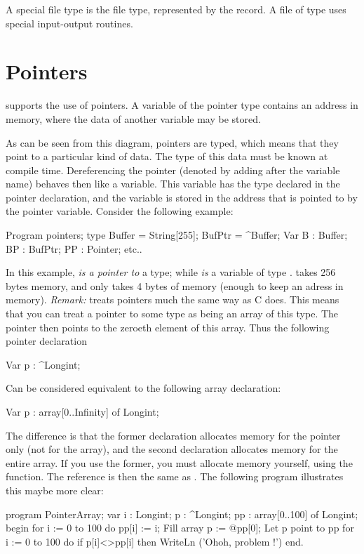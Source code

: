 \documentclass{report}
\begin{document}
A special file type is the  file type, represented by the
 record. A file of type  uses special input-output
routines.
\section{Pointers}
\fpc supports the use of pointers. A variable of the pointer type
contains an address in memory, where the data of another variable may be 
stored.

As can be seen from this diagram, pointers are typed, which means that 
they point to a particular kind of data. The type of this data must be 
known at compile time.
Dereferencing the pointer (denoted by adding \var{\^{}} after the variable
name) behaves then like a variable. This variable has the type declared in
the pointer declaration, and the variable is stored in the address that is 
pointed to by the pointer variable.
Consider the following example:
\begin{listing}
Program pointers;
type 
  Buffer = String[255];
  BufPtr = ^Buffer;
Var B  : Buffer;
    BP : BufPtr;
    PP : Pointer;
etc..
\end{listing}
In this example,  {\em is a pointer to} a  type; while 
{\em is} a variable of type .  takes 256 bytes memory,
and  only takes 4 bytes of memory (enough to keep an adress in
memory).
{\em Remark:} \fpc treats pointers much the same way as C does. This means
that you can treat a pointer to some type as being an array of this type.  
The pointer then points to the zeroeth element of this array. Thus the
following pointer declaration 
\begin{listing}
Var p : ^Longint;
\end{listing}
Can be considered equivalent to the following array declaration:
\begin{listing}
Var p : array[0..Infinity] of Longint;
\end{listing}
The difference is that the former declaration allocates memory for the
pointer only (not for the array), and the second declaration allocates
memory for the entire array. If you use the former, you must allocate memory
yourself, using the  function.
The reference  is then the same as . The following program
illustrates this maybe more clear:
\begin{listing}
program PointerArray;
var i : Longint;
    p : ^Longint;
    pp : array[0..100] of Longint;  
begin
  for i := 0 to 100 do pp[i] := i; { Fill array }
  p := @pp[0];                     { Let p point to pp }
  for i := 0 to 100 do 
    if p[i]<>pp[i] then 
      WriteLn ('Ohoh, problem !')
end.
\end{listing}
\end{document}
